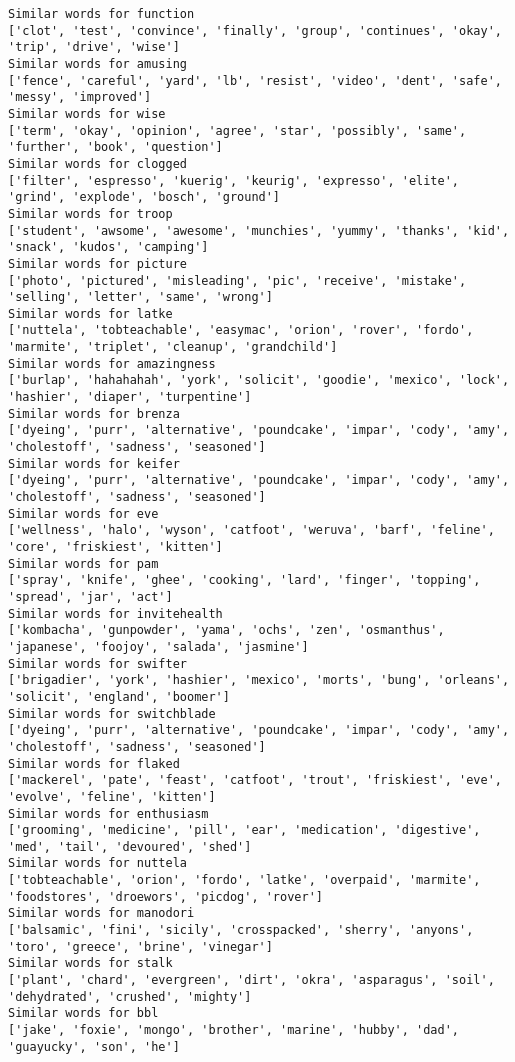 \documentclass[11pt]{article}
\begin{document}
\begin{Verbatim}[commandchars=\\\{\}]
Similar words for function
['clot', 'test', 'convince', 'finally', 'group', 'continues', 'okay', 'trip', 'drive', 'wise']
Similar words for amusing
['fence', 'careful', 'yard', 'lb', 'resist', 'video', 'dent', 'safe', 'messy', 'improved']
Similar words for wise
['term', 'okay', 'opinion', 'agree', 'star', 'possibly', 'same', 'further', 'book', 'question']
Similar words for clogged
['filter', 'espresso', 'kuerig', 'keurig', 'expresso', 'elite', 'grind', 'explode', 'bosch', 'ground']
Similar words for troop
['student', 'awsome', 'awesome', 'munchies', 'yummy', 'thanks', 'kid', 'snack', 'kudos', 'camping']
Similar words for picture
['photo', 'pictured', 'misleading', 'pic', 'receive', 'mistake', 'selling', 'letter', 'same', 'wrong']
Similar words for latke
['nuttela', 'tobteachable', 'easymac', 'orion', 'rover', 'fordo', 'marmite', 'triplet', 'cleanup', 'grandchild']
Similar words for amazingness
['burlap', 'hahahahah', 'york', 'solicit', 'goodie', 'mexico', 'lock', 'hashier', 'diaper', 'turpentine']
Similar words for brenza
['dyeing', 'purr', 'alternative', 'poundcake', 'impar', 'cody', 'amy', 'cholestoff', 'sadness', 'seasoned']
Similar words for keifer
['dyeing', 'purr', 'alternative', 'poundcake', 'impar', 'cody', 'amy', 'cholestoff', 'sadness', 'seasoned']
Similar words for eve
['wellness', 'halo', 'wyson', 'catfoot', 'weruva', 'barf', 'feline', 'core', 'friskiest', 'kitten']
Similar words for pam
['spray', 'knife', 'ghee', 'cooking', 'lard', 'finger', 'topping', 'spread', 'jar', 'act']
Similar words for invitehealth
['kombacha', 'gunpowder', 'yama', 'ochs', 'zen', 'osmanthus', 'japanese', 'foojoy', 'salada', 'jasmine']
Similar words for swifter
['brigadier', 'york', 'hashier', 'mexico', 'morts', 'bung', 'orleans', 'solicit', 'england', 'boomer']
Similar words for switchblade
['dyeing', 'purr', 'alternative', 'poundcake', 'impar', 'cody', 'amy', 'cholestoff', 'sadness', 'seasoned']
Similar words for flaked
['mackerel', 'pate', 'feast', 'catfoot', 'trout', 'friskiest', 'eve', 'evolve', 'feline', 'kitten']
Similar words for enthusiasm
['grooming', 'medicine', 'pill', 'ear', 'medication', 'digestive', 'med', 'tail', 'devoured', 'shed']
Similar words for nuttela
['tobteachable', 'orion', 'fordo', 'latke', 'overpaid', 'marmite', 'foodstores', 'droewors', 'picdog', 'rover']
Similar words for manodori
['balsamic', 'fini', 'sicily', 'crosspacked', 'sherry', 'anyons', 'toro', 'greece', 'brine', 'vinegar']
Similar words for stalk
['plant', 'chard', 'evergreen', 'dirt', 'okra', 'asparagus', 'soil', 'dehydrated', 'crushed', 'mighty']
Similar words for bbl
['jake', 'foxie', 'mongo', 'brother', 'marine', 'hubby', 'dad', 'guayucky', 'son', 'he']

\end{Verbatim}
\end{document}
